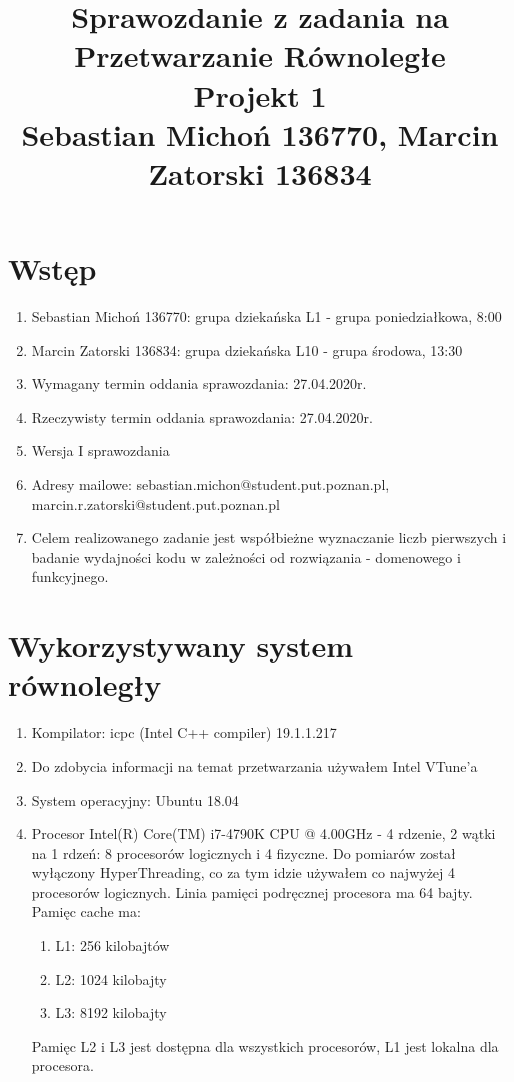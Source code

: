 \documentclass[12pt]{article}
\begin{document}
\title{Sprawozdanie z zadania na Przetwarzanie Równoległe\\
\large Projekt 1\\
\large Sebastian Michoń 136770, Marcin Zatorski 136834}
\date{\vspace{-10ex}}
\maketitle

\section{Wstęp}
\begin {enumerate}
\item Sebastian Michoń 136770: grupa dziekańska L1 - grupa poniedziałkowa, 8:00
\item Marcin Zatorski 136834: grupa dziekańska L10 - grupa środowa, 13:30
\item Wymagany termin oddania sprawozdania: 27.04.2020r.
\item Rzeczywisty termin oddania sprawozdania: 27.04.2020r.
\item Wersja I sprawozdania
\item Adresy mailowe: sebastian.michon@student.put.poznan.pl, marcin.r.zatorski@student.put.poznan.pl
\item Celem realizowanego zadanie jest współbieżne wyznaczanie liczb pierwszych i badanie wydajności kodu w zależności od rozwiązania - domenowego i funkcyjnego.
\end {enumerate}

\section{Wykorzystywany system równoległy}
\begin {enumerate}
	\item Kompilator: icpc (Intel C++ compiler) 19.1.1.217
	\item Do zdobycia informacji na temat przetwarzania używałem Intel VTune'a
	\item System operacyjny: Ubuntu 18.04
	\item Procesor Intel(R) Core(TM) i7-4790K CPU @ 4.00GHz - 4 rdzenie, 2 wątki na 1 rdzeń: 8 procesorów logicznych i 4 fizyczne. Do pomiarów został wyłączony HyperThreading, co za tym idzie używałem co najwyżej 4 procesorów logicznych. Linia pamięci podręcznej procesora ma 64 bajty. Pamięc cache ma: 
	\begin{enumerate}
		\item L1: 256 kilobajtów
		\item L2: 1024 kilobajty
		\item L3: 8192 kilobajty
	\end{enumerate}
	Pamięc L2 i L3 jest dostępna dla wszystkich procesorów, L1 jest lokalna dla procesora.
	
\end {enumerate}
\end{document}
